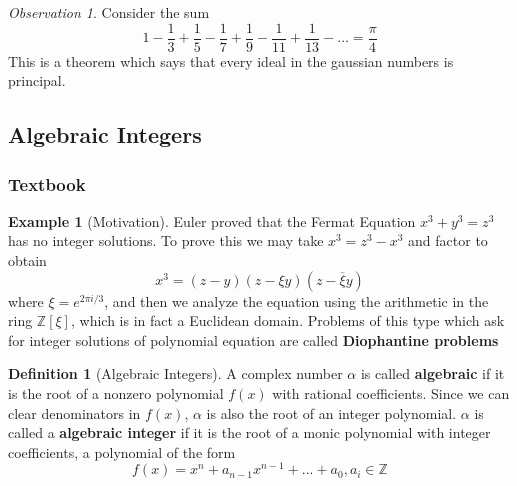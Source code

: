 \documentclass[12pt]{article}
\theoremstyle{definition}
\newtheorem{defn}[thm]{Definition}
\newtheorem{eg}[thm]{Example}
\theoremstyle{remark}
\newtheorem{obs}[thm]{Observation}
\numberwithin{equation}{section}
\newcommand\Z{\mathbb Z}    %
\newcommand\B[1]{\textbf{ #1}}
\begin{document}
\vspace{15pt}

\begin{obs}
        Consider the sum \begin{equation}
                1 - \frac{1}{3} + \frac{1}{5} - \frac{1}{7} + \frac{1}{9} - \frac{1}{11} + \frac{1}{13} - ... = \frac{\pi}{4}
        \end{equation}
        This is a theorem which says that every ideal in the gaussian numbers is principal. 
\end{obs}

\vspace{15pt}





\subsection{Algebraic Integers}

\subsubsection{Textbook}


\begin{eg}[Motivation]
        Euler proved that the Fermat Equation $x^3 + y^3 = z^3$ has no integer solutions. To prove this we may take $x^3 = z^3 - x^3$ and factor to obtain \begin{equation}
                x^3 = (z-y)(z-\xi y)(z-\overline{\xi}y)
        \end{equation}
        where $\xi = e^{2\pi i/3}$, and then we analyze the equation using the arithmetic in the ring $\Z[\xi]$, which is in fact a Euclidean domain. Problems of this type which ask for integer solutions of polynomial equation are called \B{Diophantine problems}
\end{eg}

\vspace{15pt}


\begin{defn}[Algebraic Integers]
        A complex number $\alpha$ is called \B{algebraic} if it is the root of a nonzero polynomial $f(x)$ with rational coefficients. Since we can clear denominators in $f(x)$, $\alpha$ is also the root of an integer polynomial. $\alpha$ is called a \B{algebraic integer} if it is the root of a monic polynomial with integer coefficients, a polynomial of the form \begin{equation}
                f(x) = x^n + a_{n-1}x^{n-1} + ... + a_0, a_i \in \Z
        \end{equation}
\end{defn}
\end{document}
